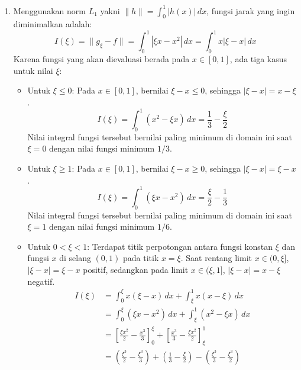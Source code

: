 \documentclass[12pt]{article}
\begin{document}
\begin{enumerate}
\begin{enumerate}
                  \item Menggunakan norm $L_1$ yakni $\|h\| = \int_0^1 |h(x)| \, dx$, fungsi jarak yang ingin diminimalkan adalah:
                        $$ I(\xi) = \|g_\xi - f\| = \int_0^1 | \xi x - x^2 | \, dx = \int_0^1 x | \xi - x | \, dx $$
                        Karena fungsi yang akan dievaluasi berada pada $x \in [0, 1]$, ada tiga kasus untuk nilai $\xi$:
                        \begin{itemize}
                              \item Untuk $\xi \le 0$: Pada $x \in [0, 1]$, bernilai $\xi - x \le 0$, sehingga $|\xi - x| = x - \xi$.
                                    $$ I(\xi) = \int_0^1 (x^2 - \xi x) \, dx = \frac{1}{3} - \frac{\xi}{2} $$
                                    Nilai integral fungsi tersebut bernilai paling minimum di domain ini saat $\xi = 0$ dengan nilai fungsi minimum $1/3$.
                              \item Untuk $\xi \ge 1$: Pada $x \in [0, 1]$, bernilai $\xi - x \ge 0$, sehingga $|\xi - x| = \xi - x$.
                                    $$ I(\xi) = \int_0^1 (\xi x - x^2) \, dx = \frac{\xi}{2} - \frac{1}{3} $$
                                    Nilai integral fungsi tersebut bernilai paling minimum di domain ini saat $\xi = 1$ dengan nilai fungsi minimum $1/6$.
                              \item Untuk $0 < \xi < 1$: Terdapat titik perpotongan antara fungsi konstan $\xi$ dan fungsi $x$ di selang $(0, 1)$ pada titik $x = \xi$. Saat rentang limit $x \in (0, \xi]$, $| \xi - x | = \xi - x$ positif, sedangkan pada limit $x \in (\xi, 1]$, $| \xi - x | = x - \xi$ negatif.
                                    \begin{align*}
                                          I(\xi) & = \int_0^\xi x (\xi - x) \, dx + \int_\xi^1 x (x - \xi) \, dx                                                                                      \\
                                                 & = \int_0^\xi (\xi x - x^2) \, dx + \int_\xi^1 (x^2 - \xi x) \, dx                                                                                  \\
                                                 & = \left[ \frac{\xi x^2}{2} - \frac{x^3}{3} \right]_0^\xi + \left[ \frac{x^3}{3} - \frac{\xi x^2}{2} \right]_\xi^1                                  \\
                                                 & = \left( \frac{\xi^3}{2} - \frac{\xi^3}{3} \right) + \left( \frac{1}{3} - \frac{\xi}{2} \right) - \left( \frac{\xi^3}{3} - \frac{\xi^3}{2} \right) \\

\end{align*}
\end{itemize}
\end{enumerate}
\end{enumerate}
\end{document}
